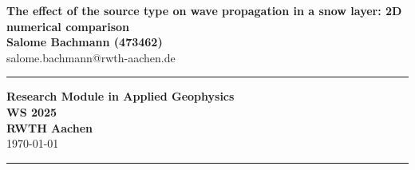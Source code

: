 \documentclass[a4paper,10pt]{article}
\begin{document}
\thispagestyle{empty} %

\begin{center} %
	\vspace*{200pt}
	\textbf{\huge{The effect of the source type on wave propagation in a snow layer: 2D numerical comparison}}\\
	\vspace{75pt}
	\textbf{\Large{Salome Bachmann (473462)}} \\\large{salome.bachmann@rwth-aachen.de}\\
	\vspace{7pt}
	\vspace{65pt}
	\rule{\linewidth}{.5pt}
		\large{\textbf{Research Module in Applied Geophysics}}\\
        \large{\textbf{WS 2025}}\\
		\large{\textbf{RWTH Aachen}}\\
		\vspace{7pt}
		\large{\today }\\
	\rule{\linewidth}{.5pt}
	\vspace{45pt}
\end{center}

\newpage
\begin{abstract}
\noindent In the following project for the lecture "Research Module in Applied Geophysics", different seismic sources will be set up and wave propagation is modelled using MONDAIC Salvus software. The models set up are a three-layer model (soil, snow, air) and a two-layer model (snow-air), the sources are an acoustic scalar point 2D source, an elastic vector point 2D source as well as a moment tensor source representing a skier on the snow. The different source types show differences in the two model types, which is explained by reflection and transmission of the waves. Furthermore, the waves have very low amplitude velocities in air, which is explained by the material density related to wave velocity. This is useful for the Master Thesis because modelling wave propagation using different sources is snow is required. 
\end{abstract}

\newpage
\tableofcontents

\newpage
{}\setcounter{page}{1}
\end{document}

